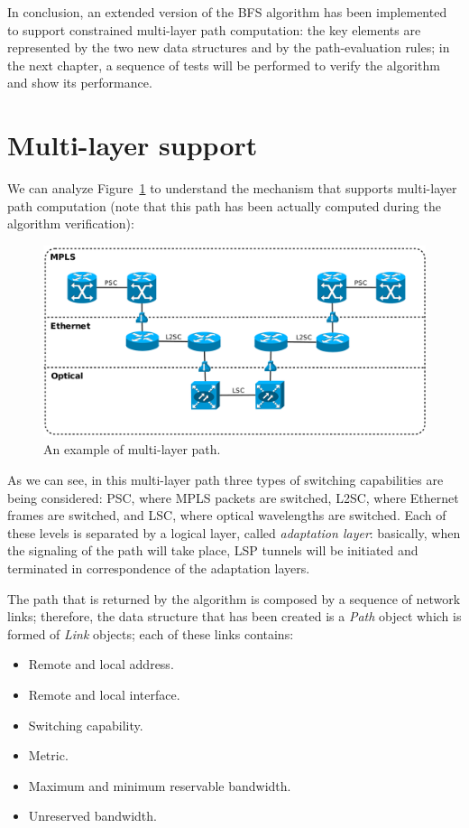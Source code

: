 \documentclass[10pt,a4paper]{report}
\begin{document}
In conclusion, an extended version of the BFS algorithm has been
implemented to support constrained multi-layer path computation: the
key elements are represented by the two new data structures and by the
path-evaluation rules; in the next chapter, a sequence of tests will
be performed to verify the algorithm and show its performance.

\section{Multi-layer support}

We can analyze Figure~\ref{fig:multi_path} to understand the mechanism
that supports multi-layer path computation (note that this path has
been actually computed during the algorithm verification):

\begin{figure}[!htbp]
  \begin{center}
    \includegraphics[width=1\textwidth]{img/multi_path}
    \caption[Multi-layer path]{An example of multi-layer path.}
    \label{fig:multi_path}
  \end{center}
\end{figure}

As we can see, in this multi-layer path three types of switching
capabilities are being considered: PSC, where MPLS packets are
switched, L2SC, where Ethernet frames are switched, and LSC, where
optical wavelengths are switched. Each of these levels is separated by
a logical layer, called \textit{adaptation layer}: basically, when the
signaling of the path will take place, LSP tunnels will be initiated
and terminated in correspondence of the adaptation layers. 

The path that is returned by the algorithm is composed by a sequence
of network links; therefore, the data structure that has been created
is a \textit{Path} object which is formed of \textit{Link} objects;
each of these links contains:
\begin{itemize}
\item Remote and local address.
\item Remote and local interface.
\item Switching capability.
\item Metric.
\item Maximum and minimum reservable bandwidth.
\item Unreserved bandwidth.
\end{itemize}
\end{document}
